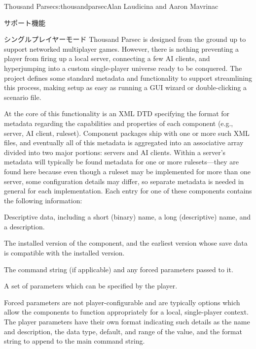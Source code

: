 \begin{aosachapter}{Thousand Parsec}{s:thousandparsec}{Alan Laudicina and Aaron Mavrinac}
\begin{aosasect1}{サポート機能}
\begin{aosasect2}{シングルプレイヤーモード}
Thousand Parsec is designed from the ground up to support networked
multiplayer games. However, there is nothing preventing a player from
firing up a local server, connecting a few AI clients, and
hyperjumping into a custom single-player universe ready to be
conquered. The project defines some standard metadata and
functionality to support streamlining this process, making setup as
easy as running a GUI wizard or double-clicking a scenario file.

At the core of this functionality is an XML DTD specifying the format
for metadata regarding the capabilities and properties of each
component (e.g., server, AI client, ruleset). Component packages ship
with one or more such XML files, and eventually all of this metadata
is aggregated into an associative array divided into two major
portions: servers and AI clients. Within a server's metadata will
typically be found metadata for one or more rulesets---they are found
here because even though a ruleset may be implemented for more than
one server, some configuration details may differ, so
separate metadata is needed in general for each implementation.
Each entry for one of these components contains the following information:

\begin{aosaitemize}

  \item Descriptive data, including a short (binary) name, a long
  (descriptive) name, and a description.

  \item The installed version of the component, and the earliest
  version whose save data is compatible with the installed version.

  \item The command string (if applicable) and any forced parameters
  passed to it.

  \item A set of parameters which can be specified by the player.

\end{aosaitemize}

Forced parameters are not player-configurable and are typically
options which allow the components to function appropriately for a
local, single-player context. The player parameters have their own
format indicating such details as the name and description, the data
type, default, and range of the value, and the format string to append
to the main command string.


\end{aosasect2}
\end{aosasect1}
\end{aosachapter}
